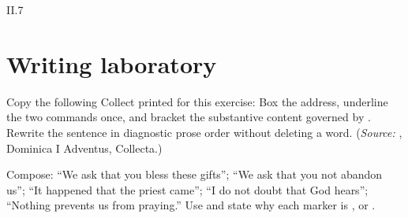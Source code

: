 \begin{courseunit}{II.7}
\section{Writing laboratory}

Copy the following Collect printed for this exercise:  Box the address,
underline the two commands once, and bracket the substantive content governed
by . Rewrite the sentence in diagnostic prose order without
deleting a word. (\emph{Source:} \Missal, Dominica I Adventus, Collecta.)

Compose: ``We ask that you bless these gifts''; ``We ask that you not abandon us''; ``It
happened that the priest came''; ``I do not doubt that God hears''; ``Nothing prevents us from
praying.''  Use  and
state why each marker is , or .



\end{courseunit}

